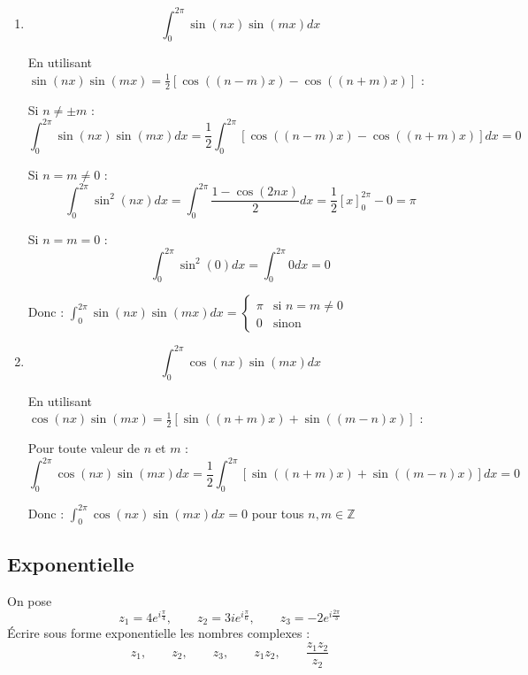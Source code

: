 {\begin{mdframed}
\begin{enumerate}
    Donc : $\int_0^{2\pi} \cos(n x) \cos(m x) dx = \begin{cases} 2\pi & \text{si } n = m = 0 \\ \pi & \text{si } n = m \neq 0 \\ 0 & \text{sinon} \end{cases}$
    
    \item $$\int_0^{2\pi} \sin(n x) \sin(m x) dx$$
    
    En utilisant $\sin(nx)\sin(mx) = \frac{1}{2}[\cos((n-m)x) - \cos((n+m)x)]$ :
    
    Si $n \neq \pm m$ :
    $$\int_0^{2\pi} \sin(n x) \sin(m x) dx = \frac{1}{2}\int_0^{2\pi} [\cos((n-m)x) - \cos((n+m)x)] dx = 0$$
    
    Si $n = m \neq 0$ :
    $$\int_0^{2\pi} \sin^2(nx) dx = \int_0^{2\pi} \frac{1-\cos(2nx)}{2} dx = \frac{1}{2}[x]_0^{2\pi} - 0 = \pi$$
    
    Si $n = m = 0$ :
    $$\int_0^{2\pi} \sin^2(0) dx = \int_0^{2\pi} 0 dx = 0$$
    
    Donc : $\int_0^{2\pi} \sin(n x) \sin(m x) dx = \begin{cases} \pi & \text{si } n = m \neq 0 \\ 0 & \text{sinon} \end{cases}$
    
    \item $$\int_0^{2\pi} \cos(n x) \sin(m x) dx$$
    
    En utilisant $\cos(nx)\sin(mx) = \frac{1}{2}[\sin((n+m)x) + \sin((m-n)x)]$ :
    
    Pour toute valeur de $n$ et $m$ :
    $$\int_0^{2\pi} \cos(n x) \sin(m x) dx = \frac{1}{2}\int_0^{2\pi} [\sin((n+m)x) + \sin((m-n)x)] dx = 0$$
    
    Donc : $\int_0^{2\pi} \cos(n x) \sin(m x) dx = 0$ pour tous $n, m \in \mathbb{Z}$
\end{enumerate}
\end{mdframed}
}{}

\vspace{2em}

\subsection{Exponentielle}
On pose 
$$z_1=4 e^{i \frac{\pi}{4}}, \qquad z_2=3 i e^{i \frac{\pi}{6}}, \qquad z_3=-2 e^{i \frac{2 \pi}{3}}$$
Écrire sous forme exponentielle les nombres complexes : 
$$z_1,\qquad z_2,\qquad z_3 , \qquad z_1 z_2, \qquad \frac{z_1 z_2}{z_2}$$

